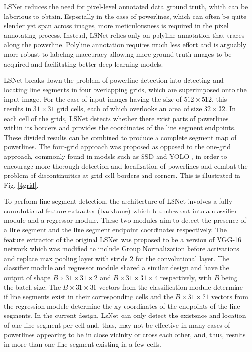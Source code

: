 \documentclass[journal]{IEEEtran}
\begin{document}
LSNet reduces the need for pixel-level annotated data ground truth, which can be laborious to obtain. Especially in the case of powerlines, which can often be quite slender yet span across images, more meticulousness is required in the pixel annotating process. Instead, LSNet relies only on polyline annotation that traces along the powerline. Polyline annotation requires much less effort and is arguably more robust to labeling inaccuracy allowing more ground-truth images to be acquired and facilitating better deep learning models. 

LSNet breaks down the problem of powerline detection into detecting and locating line segments in four overlapping grids, which are superimposed onto the input image. For the case of input images having the size of $512 \times 512$, this results in $31 \times 31$ grid cells, each of which overlooks an area of size $32 \times 32$. In each cell of the grids,  LSNet detects whether there exist parts of powerlines within its borders and provides the coordinates of the line segment endpoints. These divided results can be combined to produce a complete segment map of powerlines. The four-grid approach was proposed as opposed to the one-grid approach, commonly found in models such as SSD \cite{SSD} and YOLO \cite{YOLO}, in order to encourage more thorough detection and localization of powerlines and combat the problem of discontinuities at grid cell borders and corners. This is illustrated in Fig. \ref{4grid}. 

To perform line segment detection, the architecture of LSNet involves a fully convolutional feature extractor (backbone) which branches out into a classifier module and a regressor module. These two modules aim to detect the presence of a line segment and the line segment endpoint coordinates respectively. The feature extractor of the original LSNet was proposed to be a version of VGG-16 network \cite{vgg} which was modified to include Group Normalization \cite{group_norm} before activations and replace max pooling layer with stride 2 for the convolutional layer. The classifier module and regressor module shared a similar design and have the output of shape $B \times 31 \times 31 \times 2$ and $B \times 31 \times 31 \times 4$ respectively, with $B$ being the batch size. The $B \times 31 \times 31$ vectors from the classification module determine if line segments exist in their corresponding cells and the $B \times 31 \times 31$ vectors from the regression module determine the xy-coordinates of the endpoints of the line segments. In the current design, LsNet can only detect the existence and location of one line segment per cell and, thus, may not be effective in many cases of powerlines appearing to be in close vicinity or cross each other, and, thus, results in more than one line segment existing in a few cells.
\end{document}
